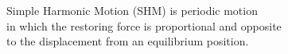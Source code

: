 \documentclass[preview]{standalone}
\begin{document}
\begin{center}
Simple Harmonic Motion (SHM) is periodic motion \\ in which the restoring force is proportional and opposite \\ to the displacement from an equilibrium position.
\end{center}
\end{document}

